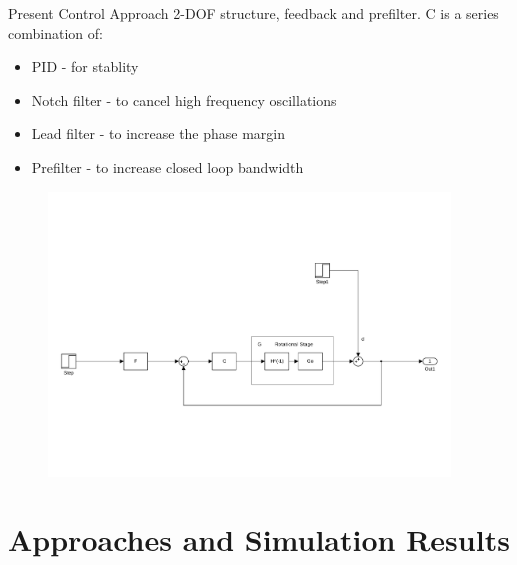 \documentclass[10pt]{beamer}
\begin{document}
\begin{frame}{Present Control Approach}
  2-DOF structure, feedback and prefilter.
  C is a series combination of:
  \begin{itemize}
    \item  \alert{PID} - for stablity
    \item  \alert{Notch filter} - to cancel high frequency oscillations
    \item  \alert{Lead filter} - to increase the phase margin
    \item \alert{Prefilter} - to increase closed loop bandwidth
  \end{itemize}

  \begin{figure}[h!]
    \centering %
    \includegraphics[width=0.95\textwidth, trim=4cm 4cm 2.1cm 10cm, clip=true]{../fig/matlab/present_controller}
  \end{figure}
\end{frame}

\section{Approaches and Simulation Results}
\end{document}
